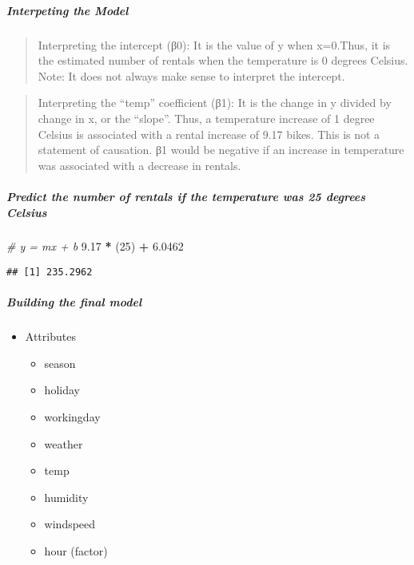\documentclass[]{article}
\newenvironment{Shaded}{\begin{snugshade}}{\end{snugshade}}
\newcommand{\DecValTok}[1]{\textcolor[rgb]{0.00,0.00,0.81}{#1}}
\newcommand{\FloatTok}[1]{\textcolor[rgb]{0.00,0.00,0.81}{#1}}
\newcommand{\StringTok}[1]{\textcolor[rgb]{0.31,0.60,0.02}{#1}}
\newcommand{\CommentTok}[1]{\textcolor[rgb]{0.56,0.35,0.01}{\textit{#1}}}
\newcommand{\OperatorTok}[1]{\textcolor[rgb]{0.81,0.36,0.00}{\textbf{#1}}}
\newcommand{\NormalTok}[1]{#1}
\providecommand{\tightlist}{%
  \setlength{\itemsep}{0pt}\setlength{\parskip}{0pt}}
\let\oldsubparagraph\subparagraph
\renewcommand{\subparagraph}[1]{\oldsubparagraph{#1}\mbox{}}
\begin{document}
\subparagraph{Interpeting the Model}\label{interpeting-the-model}

\begin{quote}
Interpreting the intercept (β0): It is the value of y when x=0.Thus, it
is the estimated number of rentals when the temperature is 0 degrees
Celsius. Note: It does not always make sense to interpret the intercept.
\end{quote}

\begin{quote}
Interpreting the ``temp'' coefficient (β1): It is the change in y
divided by change in x, or the ``slope''. Thus, a temperature increase
of 1 degree Celsius is associated with a rental increase of 9.17 bikes.
This is not a statement of causation. β1 would be negative if an
increase in temperature was associated with a decrease in rentals.
\end{quote}

\subparagraph{Predict the number of rentals if the temperature was 25
degrees
Celsius}\label{predict-the-number-of-rentals-if-the-temperature-was-25-degrees-celsius}

\begin{Shaded}
\begin{Highlighting}[]
\CommentTok{# y = mx + b}
\FloatTok{9.17} \OperatorTok{*}\StringTok{ }\NormalTok{(}\DecValTok{25}\NormalTok{) }\OperatorTok{+}\StringTok{ }\FloatTok{6.0462}
\end{Highlighting}
\end{Shaded}

\begin{verbatim}
## [1] 235.2962
\end{verbatim}

\subparagraph{Building the final model}\label{building-the-final-model}

\begin{itemize}
\tightlist
\item
  Attributes

  \begin{itemize}
  \tightlist
  \item
    season
  \item
    holiday
  \item
    workingday
  \item
    weather
  \item
    temp
  \item
    humidity
  \item
    windspeed
  \item
    hour (factor)
  \end{itemize}
\end{itemize}
\end{document}
